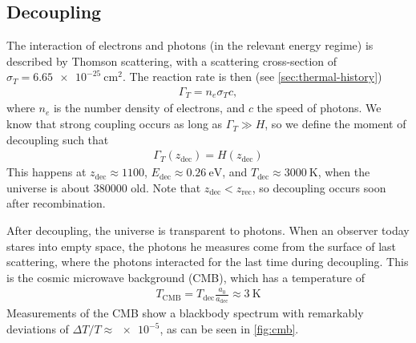 \subsection{Decoupling}

The interaction of electrons and photons (in the relevant energy regime) is described by Thomson scattering, with a scattering cross-section of $\sigma_T = \SI{6.65e-25}{\cm\squared}$. The reaction rate is then (see \cref{sec:thermal-history})
\begin{align*}
	\Gamma_T = n_e \sigma_T c,
\end{align*}
where $n_e$ is the number density of electrons, and $c$ the speed of photons. We know that strong coupling occurs as long as $\Gamma_T \gg H$, so we define the moment of decoupling such that
\begin{align*}
	\Gamma_T(z_\text{dec}) = H(z_\text{dec})
\end{align*}
This happens at $z_\text{dec} \approx 1100$, $E_\text{dec} \approx \SI{0.26}{\eV}$, and $T_\text{dec} \approx \SI{3000}{\kelvin}$, when the universe is about \SI{380000}{\year} old. Note that $z_\text{dec} < z_\text{rec}$, so decoupling occurs soon after recombination.

After decoupling, the universe is transparent to photons. When an observer today stares into empty space, the photons he measures come from the surface of last scattering, where the photons interacted for the last time during decoupling. This is the cosmic microwave background (CMB), which has a temperature of
\begin{align*}
	T_\text{CMB} = T_\text{dec}\frac{a_0}{a_\text{dec}}
	\approx \SI{3}{\kelvin}
\end{align*}
Measurements of the CMB show a blackbody spectrum with remarkably deviations of $\Delta T / T \approx \num{e-5}$, as can be seen in \cref{fig:cmb}.


